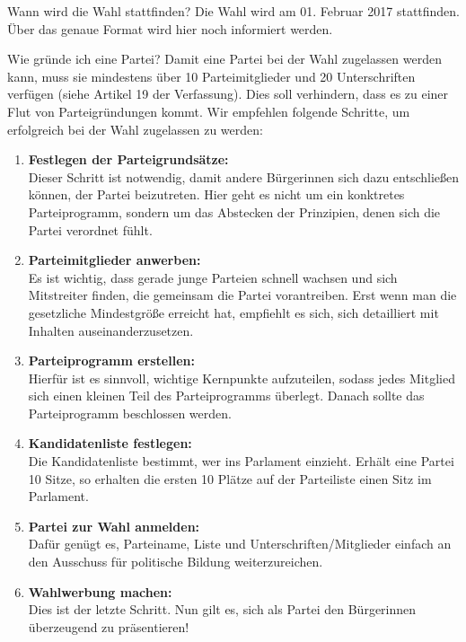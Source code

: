 \documentclass{sasbase}
\begin{document}
\begin{question}{Wann wird die Wahl stattfinden?}
	Die Wahl wird am 01. Februar 2017 stattfinden. Über das genaue Format wird hier noch informiert werden.
\end{question}
\begin{question}{Wie gr\"{u}nde ich eine Partei?}
	Damit eine Partei bei der Wahl zugelassen werden kann, muss sie mindestens \"{u}ber 10 Parteimitglieder und 20 Unterschriften verf\"{u}gen (siehe Artikel 19 der Verfassung). Dies soll verhindern, dass es zu einer Flut von Parteigr\"{u}ndungen kommt. Wir empfehlen folgende Schritte, um erfolgreich bei der Wahl zugelassen zu werden:
	\begin{enumerate}
		\item \textbf{Festlegen der Parteigrunds\"{a}tze:}\\ Dieser Schritt ist notwendig, damit andere B\"{u}rgerinnen sich dazu entschlie{\ss}en k\"{o}nnen, der Partei beizutreten. Hier geht es nicht um ein konktretes Parteiprogramm, sondern um das Abstecken der Prinzipien, denen sich die Partei verordnet f\"{u}hlt.
		\item \textbf{Parteimitglieder anwerben:}\\ Es ist wichtig, dass gerade junge Parteien schnell wachsen und sich Mitstreiter finden, die gemeinsam die Partei vorantreiben. Erst wenn man die gesetzliche Mindestgr\"{o}{\ss}e erreicht hat, empfiehlt es sich, sich detailliert mit Inhalten auseinanderzusetzen.
		\item \textbf{Parteiprogramm erstellen:}\\ Hierf\"{u}r ist es sinnvoll, wichtige Kernpunkte aufzuteilen, sodass jedes Mitglied sich einen kleinen Teil des Parteiprogramms \"{u}berlegt. Danach sollte das Parteiprogramm beschlossen werden.
		\item \textbf{Kandidatenliste festlegen:}\\ Die Kandidatenliste bestimmt, wer ins Parlament einzieht. Erh\"{a}lt eine Partei 10 Sitze, so erhalten die ersten 10 Pl\"{a}tze auf der Parteiliste einen Sitz im Parlament.
		\item \textbf{Partei zur Wahl anmelden:}\\ Daf\"{u}r gen\"{u}gt es, Parteiname, Liste und Unterschriften/Mitglieder einfach an den Ausschuss f\"{u}r politische Bildung weiterzureichen.
		\item \textbf{Wahlwerbung machen:}\\ Dies ist der letzte Schritt. Nun gilt es, sich als Partei den B\"{u}rgerinnen \"{u}berzeugend zu pr\"{a}sentieren!
	\end{enumerate}
\end{question}
\end{document}
